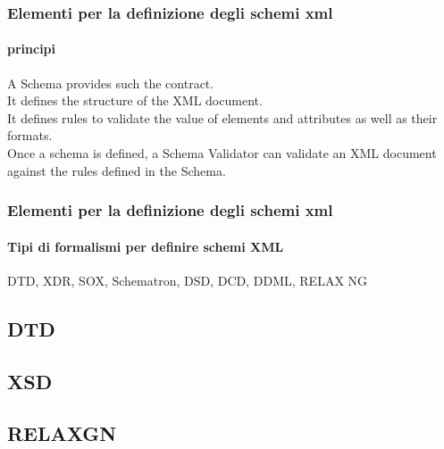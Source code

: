 \begin{frame}
    \frametitle{Elementi per la definizione degli schemi xml}
    \framesubtitle{principi}
    \addtocounter{nframe}{1}

    A Schema provides such the contract. 
    \\ It defines the structure of the XML document. 
    \\ It defines rules to validate the value of elements and attributes as well as their formats. 
    \\ Once a schema is defined, a Schema Validator can validate an XML document against the rules defined in the Schema.


\end{frame}


\begin{frame}
    \frametitle{Elementi per la definizione degli schemi xml}
    \framesubtitle{Tipi di formalismi per definire schemi XML}
    \addtocounter{nframe}{1}

   DTD, XDR, SOX, Schematron, DSD, DCD, DDML, RELAX NG

\end{frame}

\subsection{DTD}


\subsection{XSD}


\subsection{RELAXGN}
